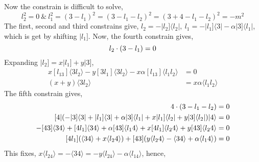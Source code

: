 Now the constrain is difficult to solve,
\[l_2^2=0\ \&\ l^2_1=(3-l_1)^2=(3-l_1-l_2)^2=(3+4-l_1-l_2)^2=-m^2\]
The first, second and third constrains give, $l_2=-|l_2]\langle l_2|,\ l_1=-|l_1]\langle 3|-\alpha|3]\langle l_1|$, which is get by shifting $|l_1]$. 
Now, the fourth constrain gives,
\[l_2\cdot \qty(3-l_1)=0\]
Expanding $|l_2]=x|l_1]+y|3]$,
\begin{align*}
    x[l_13]\langle 3l_2\rangle-y[3l_1]\langle 3l_2\rangle - x\alpha[l_13]\langle l_1l_2\rangle&=0\\
    (x+y)\langle 3l_2\rangle &= x\alpha\langle l_1l_2\rangle
\end{align*}
The fifth constrain gives,
\begin{align*}
    4\cdot \qty(3-l_1-l_2)&=0\\
    [4|(-|3]\langle3|+|l_1]\langle 3|+\alpha|3]\langle l_1|+x|l_1]\langle l_2|+y|3]\langle l_2|)|4\rangle&=0\\
    -[43]\langle34\rangle+[4l_1]\langle 34\rangle+\alpha[43]\langle l_14\rangle+x[4l_1]\langle l_24\rangle+y[43]\langle l_24\rangle&=0\\
    [4l_1](\langle 34\rangle+x\langle l_24\rangle)+[43](y\langle l_24\rangle-\langle34\rangle+\alpha\langle l_14\rangle)&=0
\end{align*}
This fixes, $x\langle l_24\rangle=-\langle34\rangle=-y\langle l_24\rangle-\alpha\langle l_14\rangle$, hence, 